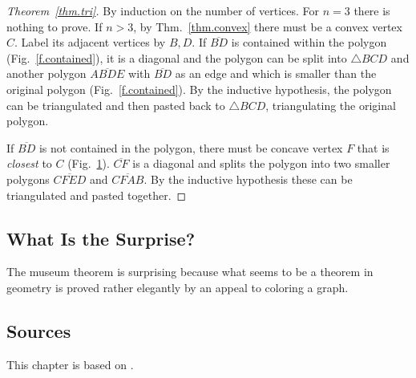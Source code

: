 \begin{proof}[Theorem~\ref{thm.tri}]
By induction on the number of vertices. For $n=3$ there is nothing to prove. If $n>3$, by Thm.~\ref{thm.convex} there must be a convex vertex $C$. Label its adjacent vertices by $B,D$. If $\overline{BD}$ is contained within the polygon (Fig.~\ref{f.contained}), it is a diagonal and the polygon can be split into $\triangle BCD$ and another polygon $\overline{ABDE}$ with $\overline{BD}$ as an edge and which is smaller than the original polygon (Fig.~\ref{f.contained}). By the inductive hypothesis, the polygon can be triangulated and then pasted back to $\triangle BCD$, triangulating the original polygon.

\begin{figure}[t]
\subfigures
{}
\hfill
{}
\label{f.contained}
\label{f.museum.concave-vertices}
\end{figure}
If $\overline{BD}$ is not contained in the polygon, there must be concave vertex $F$ that is \emph{closest} to $C$ (Fig.~\ref{f.museum.concave-vertices}). $\overline{CF}$ is a diagonal and splits the polygon into two smaller polygons $\overline{CFED}$ and $\overline{CFAB}$. By the inductive hypothesis these can be triangulated and pasted together.
\end{proof}

\subsection*{What Is the Surprise?}
The museum theorem is surprising because what seems to be a theorem in geometry is proved rather elegantly by an appeal to coloring a graph.

\subsection*{Sources}

This chapter is based on \cite[Chap.~39]{thebook}.
